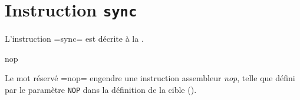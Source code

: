 












\section{Instruction \texttt{sync}}

L'instruction \omnibus=sync= est décrite à la .






\begin{OMNIBUS}
nop
\end{OMNIBUS}

Le mot réservé \omnibus=nop= engendre une instruction assembleur \emph{nop}, telle que défini par le paramètre \texttt{NOP} dans la définition de la cible ().

